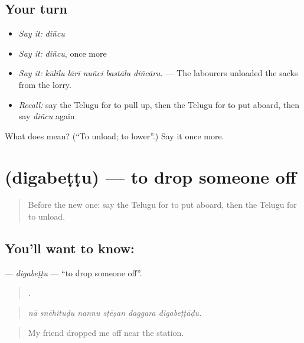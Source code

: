 \subsection*{Your turn}
\begin{itemize}
\raggedright
  \item \emph{Say it:} \emph{diñcu}
  \item \emph{Say it:} \emph{diñcu}, once more
  \item \emph{Say it:} \emph{kūlīlu lārī nuñci bastālu diñcāru.} — The labourers unloaded the sacks from the lorry.
  \item \emph{Recall:} say the Telugu for to pull up, then the Telugu for to put aboard, then say \emph{diñcu} again
\end{itemize}

\begin{tcolorbox}[breakable,colback=teal!4,colframe=teal!35!black,title={Before you move on}]
What does  mean? (\textquotedblleft{}To unload; to lower\textquotedblright{}.) Say it once more.
\end{tcolorbox}
\section[\texorpdfstring{\te{దిగబెట్టు} (digabeṭṭu)}{దిగబెట్టు (digabeṭṭu)}]{ (digabeṭṭu) — to drop someone off}

\label{lesson:TE-C450-digabettu}



\begin{quote}
Before the new one: say the Telugu for to put aboard, then the Telugu for to unload.
\end{quote}

\subsection*{You'll want to know: }
\textbf{} — \emph{digabeṭṭu} — \textquotedblleft{}to drop someone off\textquotedblright{}.

\begin{quote}
     .
\end{quote}

\begin{quote}
\emph{nā snēhituḍu nannu sṭēṣan daggara digabeṭṭāḍu.}
\end{quote}

\begin{quote}
My friend dropped me off near the station.
\end{quote}

